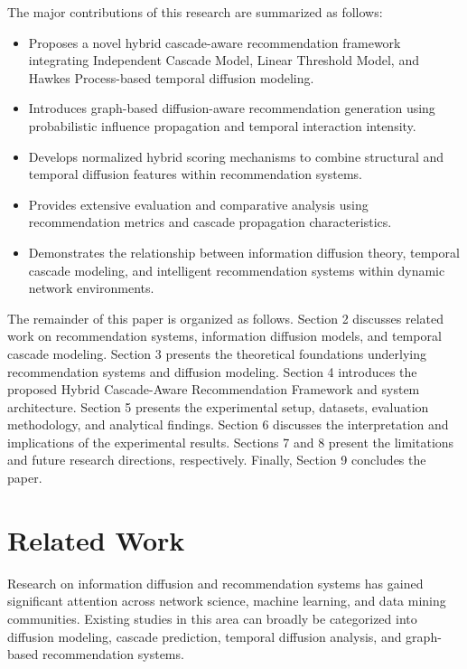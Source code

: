 \documentclass{article}
\begin{document}
The major contributions of this research are summarized as follows:
\begin{itemize}

\item Proposes a novel hybrid cascade-aware recommendation framework integrating Independent Cascade Model, Linear Threshold Model, and Hawkes Process-based temporal diffusion modeling.

\item Introduces graph-based diffusion-aware recommendation generation using probabilistic influence propagation and temporal interaction intensity.

\item Develops normalized hybrid scoring mechanisms to combine structural and temporal diffusion features within recommendation systems.

\item Provides extensive evaluation and comparative analysis using recommendation metrics and cascade propagation characteristics.

\item Demonstrates the relationship between information diffusion theory, temporal cascade modeling, and intelligent recommendation systems within dynamic network environments.

\end{itemize}
The remainder of this paper is organized as follows. Section 2 discusses related work on recommendation systems, information diffusion models, and temporal cascade modeling. Section 3 presents the theoretical foundations underlying recommendation systems and diffusion modeling. Section 4 introduces the proposed Hybrid Cascade-Aware Recommendation Framework and system architecture. Section 5 presents the experimental setup, datasets, evaluation methodology, and analytical findings. Section 6 discusses the interpretation and implications of the experimental results. Sections 7 and 8 present the limitations and future research directions, respectively. Finally, Section 9 concludes the paper.
\section{Related Work}

Research on information diffusion and recommendation systems has gained significant attention across network science, machine learning, and data mining communities. Existing studies in this area can broadly be categorized into diffusion modeling, cascade prediction, temporal diffusion analysis, and graph-based recommendation systems.
\end{document}
